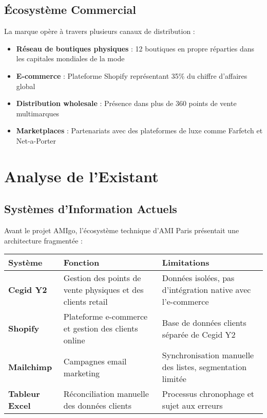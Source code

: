 \subsection{Écosystème Commercial}
La marque opère à travers plusieurs canaux de distribution :

\begin{itemize}
    \item \textbf{Réseau de boutiques physiques} : 12 boutiques en propre réparties dans les capitales mondiales de la mode
    \item \textbf{E-commerce} : Plateforme Shopify représentant 35\% du chiffre d'affaires global
    \item \textbf{Distribution wholesale} : Présence dans plus de 360 points de vente multimarques
    \item \textbf{Marketplaces} : Partenariats avec des plateformes de luxe comme Farfetch et Net-a-Porter
\end{itemize}

\section{Analyse de l'Existant}

\subsection{Systèmes d'Information Actuels}
Avant le projet AMIgo, l'écosystème technique d'AMI Paris présentait une architecture fragmentée :

\begin{center}
\begin{tabular}{|>{
\bfseries}p{3.5cm}|p{5cm}|p{5cm}|}
\hline
\rowcolor{lightblue} Système & Fonction & Limitations \\
\hline
Cegid Y2 & Gestion des points de vente physiques et des clients retail & Données isolées, pas d'intégration native avec l'e-commerce \\
\hline
Shopify & Plateforme e-commerce et gestion des clients online & Base de données clients séparée de Cegid Y2 \\
\hline
Mailchimp & Campagnes email marketing & Synchronisation manuelle des listes, segmentation limitée \\
\hline
Tableur Excel & Réconciliation manuelle des données clients & Processus chronophage et sujet aux erreurs \\
\hline
\end{tabular}
\end{center}

